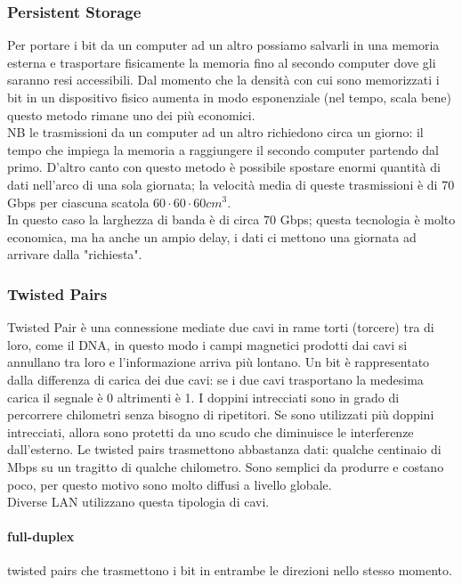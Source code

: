 \documentclass{article}
\begin{document}
\subsubsection{Persistent Storage} 
Per portare i bit da un computer ad un altro possiamo salvarli in una memoria
esterna e trasportare fisicamente la memoria fino al secondo computer dove gli 
saranno resi accessibili.
Dal momento che la densità con cui sono memorizzati i bit in un dispositivo
fisico aumenta in modo esponenziale (nel tempo, scala bene) questo metodo rimane uno dei
più economici.\\
NB le trasmissioni da un computer ad un altro richiedono circa un
giorno: il tempo che impiega la memoria a raggiungere il secondo computer
partendo dal primo. D'altro canto con questo metodo è possibile spostare enormi
quantità di dati nell'arco di una sola giornata; la velocità media di queste
trasmissioni è di 70 Gbps per ciascuna scatola $60 \cdot 60 \cdot 60 cm^3$.\\
In questo caso la larghezza di banda è di circa 70 Gbps; questa tecnologia è
molto economica, ma ha anche un ampio delay, i dati ci mettono una giornata ad
arrivare dalla "richiesta".

\subsubsection{Twisted Pairs}
Twisted Pair è una connessione mediate due cavi in rame torti (torcere) tra di
loro, come il DNA, in questo modo i campi magnetici prodotti dai cavi si
annullano tra loro e l'informazione arriva più lontano. Un bit è rappresentato
dalla differenza di carica dei due cavi: se i due cavi trasportano la medesima
carica il segnale è 0 altrimenti è 1. I doppini intrecciati sono in grado di
percorrere chilometri senza bisogno di ripetitori. Se sono utilizzati  
più doppini intrecciati, allora sono protetti da uno scudo che diminuisce le
interferenze dall'esterno. Le twisted pairs trasmettono abbastanza dati:
qualche centinaio di Mbps su un tragitto di qualche chilometro. Sono semplici
da produrre e costano poco, per questo motivo sono molto diffusi a livello
globale.\\
Diverse LAN utilizzano questa tipologia di cavi.

\paragraph{full-duplex} twisted pairs che trasmettono i bit in
entrambe le direzioni nello stesso momento.
\end{document}
